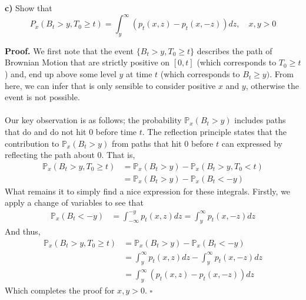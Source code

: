 \documentclass{article}
\begin{document}
\begin{tcolorbox}
[colframe=black,colback=gray!5,boxrule=0.5pt]
\textbf{c)} Show that $$P_x(B_t > y, T_0 \geq t) = \int_{y}^{\infty}(p_t(x,z) - p_t(x,-z))dz, \quad x,y > 0$$
\end{tcolorbox}
\textbf{Proof.} We first note that the event $\{B_t > y, T_0\geq t\}$ describes the path of Brownian Motion that are strictly positive on $[0,t]$ (which corresponds to $T_0\geq t$) and, end up above some level $y$ at time $t$ (which corresponds to $B_t\geq  y)$. From here, we can infer that is only sensible to consider positive $x$ and $y$, otherwise the event is not possible.  \\
\\
Our key observation is as follows; the probability $\mathbb{P}_x(B_t>y)$  includes paths that do and do not hit 0 before time $t$. The reflection principle states that the contribution to $\mathbb{P}_x(B_t>y)$ from paths that hit 0 before $t$ can expressed by reflecting the path about 0. That is, 
\begin{align*}
    \mathbb{P}_x(B_t>y,T_0\geq t) &= \mathbb{P}_x(B_t>y) - \mathbb{P}_x(B_t>y,T_0<t) \\
    &= \mathbb{P}_x(B_t>y) - \mathbb{P}_x(B_t<-y)
\end{align*}
What remains it to simply find a nice expression for these integrals. Firstly, we apply a change of variables to see that 
\begin{align*}
    \mathbb{P}_x(B_t<-y) &= \int_{-\infty}^{-y}p_t(x,z)dz = \int_{y}^\infty p_t(x,-z)dz
\end{align*}
And thus, 
\begin{align*}
    \mathbb{P}_x(B_t>y,T_0\geq t) &= \mathbb{P}_x(B_t>y) - \mathbb{P}_x(B_t<-y) \\
    &= \int_y^{\infty}p_t(x, z)dz - \int_{y}^\infty p_t(x,-z)dz \\
    &= \int_{y}^{\infty}(p_t(x,z) - p_t(x,-z))dz
\end{align*}
Which completes the proof for $x,y>0$. $\square$

\newpage
 
\end{document}
